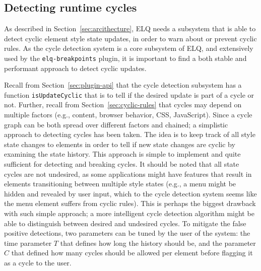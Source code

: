 \documentclass[a4paper,11pt]{kth-mag}
\newcommand{\code}[1]{\texttt{#1}}
\begin{document}
      \subsection{Detecting runtime cycles}\label{sec:imp_cycle_detector}
        As described in Section~\ref{sec:arcithecture}, \gls{ELQ} needs a subsystem that is able to detect cyclic element style state updates, in order to warn about or prevent cyclic rules.
        As the cycle detection system is a core subsystem of \gls{ELQ}, and extensively used by the \code{elq-breakpoints} plugin, it is important to find a both stable and performant approach to detect cyclic updates.

        Recall from Section~\ref{sec:plugin-api} that the cycle detection subsystem has a function \code{isUpdateCyclic} that is to tell if the desired update is part of a cycle or not.
        Further, recall from Section~\ref{sec:cyclic-rules} that cycles may depend on multiple factors (e.g., content, browser behavior, \gls{CSS}, \gls{JavaScript}).
        Since a cycle graph can be both spread over different factors and chained; a simplistic approach to detecting cycles has been taken.
        The idea is to keep track of all style state changes to elements in order to tell if new state changes are cyclic by examining the state history.
        This approach is simple to implement and quite sufficient for detecting and breaking cycles.
        It should be noted that all state cycles are not undesired, as some applications might have features that result in elements transitioning between multiple style states (e.g., a menu might be hidden and revealed by user input, which to the cycle detection system seems like the menu element suffers from cyclic rules).
        This is perhaps the biggest drawback with such simple approach; a more intelligent cycle detection algorithm might be able to distinguish between desired and undesired cycles.
        To mitigate the false positive detections, two parameters can be tuned by the user of the system: the time parameter $T$ that defines how long the history should be, and the parameter $C$ that defined how many cycles should be allowed per element before flagging it as a cycle to the user.
        
\end{document}
